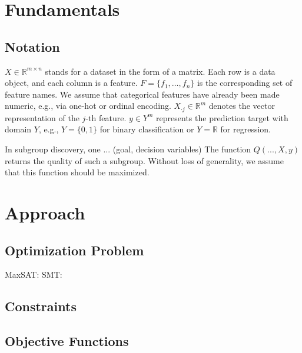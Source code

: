 \documentclass{article}
\theoremstyle{definition}
\begin{document}
\section{Fundamentals}
\label{sec:osd:fundamentals}

\cite{helal2016subgroup} \cite{herrera2011overview} \cite{atzmueller2015subgroup} \cite{ventura2018subgroup} \cite{meeng2021real}

\subsection{Notation}
\label{sec:osd:fundamentals:notation}

$X \in \mathbb{R}^{m \times n}$ stands for a dataset in the form of a matrix.
Each row is a data object, and each column is a feature.
$F = \{f_1, \dots, f_n\}$ is the corresponding set of feature names.
We assume that categorical features have already been made numeric, e.g., via one-hot or ordinal encoding.
$X_{\cdot{}j} \in \mathbb{R}^m$ denotes the vector representation of the $j$-th feature.
$y \in Y^m$ represents the prediction target with domain $Y$, e.g., $Y=\{0,1\}$ for binary classification or $Y=\mathbb{R}$ for regression.

In subgroup discovery, one ... (goal, decision variables)
The function $Q(...,X,y)$ returns the quality of such a subgroup.
Without loss of generality, we assume that this function should be maximized.

\section{Approach}
\label{sec:osd:approach}

\subsection{Optimization Problem}
\label{sec:osd:approach:problem}

MaxSAT: \cite{li2021maxsat} \cite{bacchus2021maximum}
SMT: \cite{barrett2018satisfiability}

\subsection{Constraints}
\label{sec:osd:approach:constraints}

\cite{mosek2022modeling}
\cite{sinz2005towards}
\cite{ulrich2022selecting}

\subsection{Objective Functions}
\label{sec:osd:approach:objectives}
\end{document}
